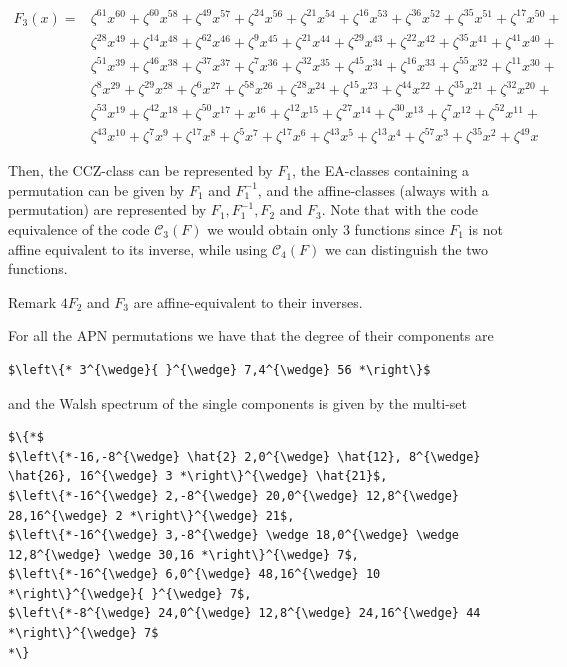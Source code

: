 \documentclass[10pt]{article}
\begin{document}
$$
\begin{aligned}
F_{3}(x)= & \zeta^{61} x^{60}+\zeta^{60} x^{58}+\zeta^{49} x^{57}+\zeta^{24} x^{56}+\zeta^{21} x^{54}+\zeta^{16} x^{53}+\zeta^{36} x^{52}+\zeta^{35} x^{51}+\zeta^{17} x^{50}+ \\
& \zeta^{28} x^{49}+\zeta^{14} x^{48}+\zeta^{62} x^{46}+\zeta^{9} x^{45}+\zeta^{21} x^{44}+\zeta^{29} x^{43}+\zeta^{22} x^{42}+\zeta^{35} x^{41}+\zeta^{41} x^{40}+ \\
& \zeta^{51} x^{39}+\zeta^{46} x^{38}+\zeta^{37} x^{37}+\zeta^{7} x^{36}+\zeta^{32} x^{35}+\zeta^{45} x^{34}+\zeta^{16} x^{33}+\zeta^{55} x^{32}+\zeta^{11} x^{30}+ \\
& \zeta^{8} x^{29}+\zeta^{29} x^{28}+\zeta^{6} x^{27}+\zeta^{58} x^{26}+\zeta^{28} x^{24}+\zeta^{15} x^{23}+\zeta^{44} x^{22}+\zeta^{35} x^{21}+\zeta^{32} x^{20}+ \\
& \zeta^{53} x^{19}+\zeta^{42} x^{18}+\zeta^{50} x^{17}+x^{16}+\zeta^{12} x^{15}+\zeta^{27} x^{14}+\zeta^{30} x^{13}+\zeta^{7} x^{12}+\zeta^{52} x^{11}+ \\
& \zeta^{43} x^{10}+\zeta^{7} x^{9}+\zeta^{17} x^{8}+\zeta^{5} x^{7}+\zeta^{17} x^{6}+\zeta^{43} x^{5}+\zeta^{13} x^{4}+\zeta^{57} x^{3}+\zeta^{35} x^{2}+\zeta^{49} x
\end{aligned}
$$

Then, the CCZ-class can be represented by $F_{1}$, the EA-classes containing a permutation can be given by $F_{1}$ and $F_{1}^{-1}$, and the affine-classes (always with a permutation) are represented by $F_{1}, F_{1}^{-1}, F_{2}$ and $F_{3}$. Note that with the code equivalence of the code $\mathscr{C}_{3}(F)$ we would obtain only 3 functions since $F_{1}$ is not affine equivalent to its inverse, while using $\mathscr{C}_{4}(F)$ we can distinguish the two functions.

Remark $4 F_{2}$ and $F_{3}$ are affine-equivalent to their inverses.

For all the APN permutations we have that the degree of their components are

\begin{verbatim}
$\left\{* 3^{\wedge}{ }^{\wedge} 7,4^{\wedge} 56 *\right\}$
\end{verbatim}

and the Walsh spectrum of the single components is given by the multi-set

\begin{verbatim}
$\{*$
$\left\{*-16,-8^{\wedge} \hat{2} 2,0^{\wedge} \hat{12}, 8^{\wedge} \hat{26}, 16^{\wedge} 3 *\right\}^{\wedge} \hat{21}$,
$\left\{*-16^{\wedge} 2,-8^{\wedge} 20,0^{\wedge} 12,8^{\wedge} 28,16^{\wedge} 2 *\right\}^{\wedge} 21$,
$\left\{*-16^{\wedge} 3,-8^{\wedge} \wedge 18,0^{\wedge} \wedge 12,8^{\wedge} \wedge 30,16 *\right\}^{\wedge} 7$,
$\left\{*-16^{\wedge} 6,0^{\wedge} 48,16^{\wedge} 10 *\right\}^{\wedge}{ }^{\wedge} 7$,
$\left\{*-8^{\wedge} 24,0^{\wedge} 12,8^{\wedge} 24,16^{\wedge} 44 *\right\}^{\wedge} 7$
*\}
\end{verbatim}
\end{document}
